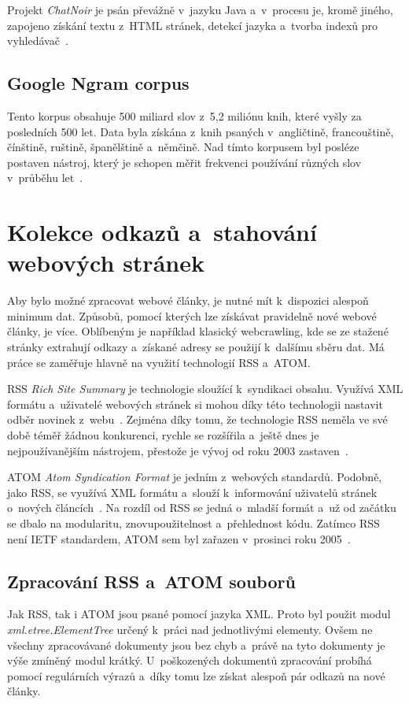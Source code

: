 Projekt \textit{ChatNoir} je psán převážně v~jazyku Java a~v~procesu je, kromě jiného, zapojeno získání textu
z~HTML stránek, detekcí jazyka a~tvorba indexů pro vyhledávač~\cite{CHATNOIR_GIT}.

\section{Google Ngram corpus}
Tento korpus obsahuje 500 miliard slov z~5,2 miliónu knih, které vyšly za posledních 500 let.
Data byla získána z~knih psaných v~angličtině, francouštině, čínštině, ruštině,
španělštině a~němčině. Nad tímto korpusem byl posléze postaven nástroj, který
je schopen měřit frekvenci používání různých slov v~průběhu let~\cite{NGRAM}.

\chapter{Kolekce odkazů a~stahování webových stránek} %
Aby bylo možné zpracovat webové články, je nutné mít k~dispozici alespoň minimum dat. Způsobů, pomocí kterých lze získávat pravidelně nové webové
články, je více. Oblíbeným je například klasický webcrawling, kde se ze stažené stránky extrahují odkazy a~získané adresy se použijí k~dalšímu sběru dat. Má práce se zaměřuje hlavně na využití technologií RSS a~ATOM.

RSS \textit{Rich Site Summary} je technologie sloužící k~syndikaci obsahu. Využívá XML formátu a~uživatelé
webových stránek si mohou díky této technologii nastavit odběr novinek z~webu~\cite{RSS}. Zejména díky tomu, že technologie RSS neměla ve
své době téměř žádnou konkurenci, rychle se rozšířila a~ještě dnes je nejpoužívanějším nástrojem, přestože je vývoj od roku 2003
zastaven~\cite{ATOM_VS_RSS}.

ATOM \textit{Atom Syndication Format} je jedním z~webových standardů. Podobně, jako RSS, se využívá XML formátu a~slouží
k~informování uživatelů stránek o~nových článcích~\cite{ATOM}. Na rozdíl od RSS se jedná o~mladší formát a~už od začátku se dbalo na
modularitu, znovupoužitelnost a~přehlednost kódu. Zatímco RSS není IETF standardem, ATOM sem byl zařazen v~prosinci roku 2005~\cite{ATOM_VS_RSS}.

\section{Zpracování RSS a~ATOM souborů}
Jak RSS, tak i ATOM jsou psané pomocí jazyka XML. Proto byl použit modul \linebreak\textit{xml.etree.ElementTree} určený k~práci nad jednotlivými
elementy. Ovšem ne všechny zpracovávané dokumenty jsou bez chyb a~právě na tyto dokumenty je výše zmíněný modul krátký. U~poškozených
dokumentů zpracování probíhá pomocí regulárních výrazů a~díky tomu lze získat alespoň pár odkazů na nové články.

